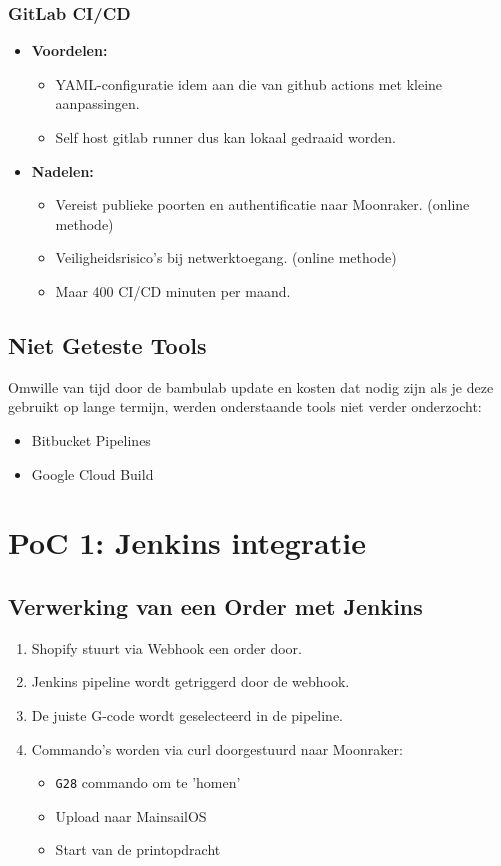 \subsubsection{GitLab CI/CD}
\begin{itemize}
    \item \textbf{Voordelen:}
    \begin{itemize}
        \item YAML-configuratie idem aan die van github actions met kleine aanpassingen.
        \item Self host gitlab runner dus kan lokaal gedraaid worden.
    \end{itemize}
    \item \textbf{Nadelen:}
    \begin{itemize}
        \item Vereist publieke poorten en authentificatie naar Moonraker. (online methode)
        \item Veiligheidsrisico’s bij netwerktoegang. (online methode)
        \item Maar 400 CI/CD minuten per maand.
    \end{itemize}
\end{itemize}

\subsection{Niet Geteste Tools}
Omwille van tijd door de bambulab update en kosten dat nodig zijn als je deze gebruikt op lange termijn, werden onderstaande tools niet verder onderzocht:
\begin{itemize}
    \item Bitbucket Pipelines
    \item Google Cloud Build
\end{itemize}

\section{PoC 1: Jenkins integratie}
\subsection{Verwerking van een Order met Jenkins}
\begin{enumerate}
    \item Shopify stuurt via Webhook een order door.
    \item Jenkins pipeline wordt getriggerd door de webhook.
    \item De juiste G-code wordt geselecteerd in de pipeline.
    \item Commando’s worden via curl doorgestuurd naar Moonraker:
    \begin{itemize}
        \item \texttt{G28} commando om te 'homen'
        \item Upload naar MainsailOS
        \item Start van de printopdracht
    \end{itemize}
\end{enumerate}

